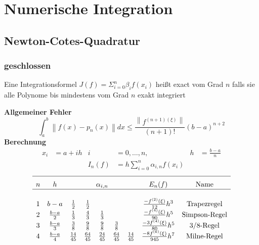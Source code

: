 \documentclass[
	ngerman,
	accentcolor=9c,%
	type=intern,
	marginpar=false
	]{tudapub}
\begin{document}
\section{Numerische Integration}
    \subsection{Newton-Cotes-Quadratur}
        \subsubsection{geschlossen}
            \begin{definition}
                Eine Integrationsformel $J(f) = \Sigma_{i=0}^n \beta_i f(x_i)$ heißt exact vom Grad $n$
                falls sie alle Polynome bis mindestens vom Grad $n$ exakt integriert 
            \end{definition}
            \textbf{Allgemeiner Fehler}
            \begin{equation*}
                \int_a^b \left\| f(x)  - p_n(x) \right\| dx \leq \dfrac{\left\| f^{(n+1)(\xi)}\right\|}{(n+1)!}(b-a)^{n+2}
            \end{equation*}
            \textbf{Berechnung}
            \begin{align*}
                x_i &= a+ih &  i&=0,\dots,n, &  h&=\frac{b-a}{n} \\
                & & I_n(f) &= h \sum^n_{i=0} \alpha_{i,n} f(x_i)
            \end{align*}
            \begin{equation*}
                \begin{array}{c c c c c c c c c}
                    \hline\\[-.5\normalbaselineskip]
                    n & h & \multicolumn{5}{c}{\alpha_{i,n}}& E_n (f) & \text{Name}\\
                    \hline\\
                    1 & b-a & \frac{1}{2} & \frac{1}{2} & & & & \frac{-f^{(2)}(\xi)}{12}h^3 & \text{Trapezregel}\\
                    2 & \frac{b-a}{2} & \frac{1}{3} & \frac{4}{3} & \frac{1}{3} & & & \frac{-f^{(4)}(\xi)}{90}h^5 & \text{Simpson-Regel}\\
                    3 & \frac{b-a}{3} & \frac{3}{8} & \frac{9}{8} & \frac{9}{8} & \frac{3}{8} & & \frac{-3f^{(4)}(\xi)}{80}h^5 & \text{3/8-Regel}\\
                    4 & \frac{b-a}{4} & \frac{14}{45} & \frac{64}{45} & \frac{24}{45} & \frac{64}{45} & \frac{14}{45} & \frac{-8f^{(6)}(\xi)}{945}h^7 & \text{Milne-Regel}\\
                \end{array}
            \end{equation*}
\end{document}

